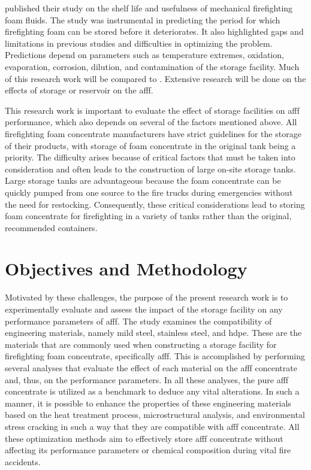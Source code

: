 \cite{meldrum1965storage} published their study on the shelf life and usefulness of mechanical firefighting foam fluids. The study was instrumental in predicting the period for which firefighting foam can be stored before it deteriorates. It also highlighted gaps and limitations in previous studies and difficulties in optimizing the problem. Predictions depend on parameters such as temperature extremes, oxidation, evaporation, corrosion, dilution, and contamination of the storage facility. Much of this research work will be compared to \cite{meldrum1965storage}. Extensive research will be done on the effects of storage or reservoir on the \acrshort{afff}. 

This research work is important to evaluate the effect of storage facilities on \acrshort{afff} performance, which also depends on several of the factors mentioned above. All firefighting foam concentrate manufacturers have strict guidelines for the storage of their products, with storage of foam concentrate in the original tank being a priority. The difficulty arises because of critical factors that must be taken into consideration and often leads to the construction of large on-site storage tanks. Large storage tanks are advantageous because the foam concentrate can be quickly pumped from one source to the fire trucks during emergencies without the need for restocking. Consequently, these critical considerations lead to storing foam concentrate for firefighting in a variety of tanks rather than the original, recommended containers.

\section{Objectives and Methodology}
Motivated by these challenges, the purpose of the present research work is to experimentally evaluate and assess the impact of the storage facility on any performance parameters of \acrshort{afff}. The study examines the compatibility of engineering materials, namely mild steel, stainless steel, and \acrfull{hdpe}. These are the materials that are commonly used when constructing a storage facility for firefighting foam concentrate, specifically \acrshort{afff}. This is accomplished by performing several analyses that evaluate the effect of each material on the \acrshort{afff} concentrate and, thus, on the performance parameters. In all these analyses, the pure \acrshort{afff} concentrate is utilized as a benchmark to deduce any vital alterations. In such a manner, it is possible to enhance the properties of these engineering materials based on the heat treatment process, microstructural analysis, and environmental stress cracking in such a way that they are compatible with \acrshort{afff} concentrate. All these optimization methods aim to effectively store \acrshort{afff} concentrate without affecting its performance parameters or chemical composition during vital fire accidents.  

